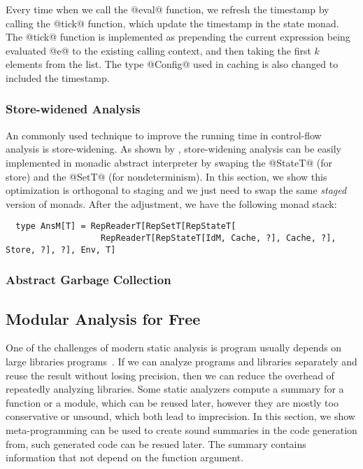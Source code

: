 Every time when we call the @eval@ function, we refresh the timestamp by calling
the @tick@ function, which update the timestamp in the state monad. The @tick@
function is implemented as prepending the current expression being evaluated @e@
to the existing calling context, and then taking the first $k$ elements from the list.
The type @Config@ used in caching is also changed to included the timestamp.

\subsubsection{Store-widened Analysis}

An commonly used technique to improve the running time in control-flow analysis
is store-widening. As shown by \cite{Darais:2015:GTM:2814270.2814308,
DBLP:journals/pacmpl/DaraisLNH17}, store-widening analysis can be easily
implemented in monadic abstract interpreter by swaping the @StateT@ (for store)
and the @SetT@ (for nondeterminism). In this section, we show this optimization
is orthogonal to staging and we just need to swap the same \textit{staged}
version of monads. After the adjustment, we have the following monad stack:

\begin{lstlisting}
  type AnsM[T] = RepReaderT[RepSetT[RepStateT[
                   RepReaderT[RepStateT[IdM, Cache, ?], Cache, ?], Store, ?], ?], Env, T]
\end{lstlisting}



\subsubsection{Abstract Garbage Collection}


\subsection{Modular Analysis for Free} \label{modular}


One of the challenges of modern static analysis is program usually depends on
large libraries programs~\cite{toman_et_al:LIPIcs:2017:7121}. If we can analyze
programs and libraries separately and reuse the result without losing precision,
then we can reduce the overhead of repeatedly analyzing libraries.
Some static analyzers compute a summary for a function or a module, which
can be reused later, however they are mostly too conservative or unsound, which
both lead to imprecision. In this section, we show meta-programming can be used
to create sound summaries in the code generation from, such generated code can
be resued later. The summary contains information that not depend on the
function argument.

